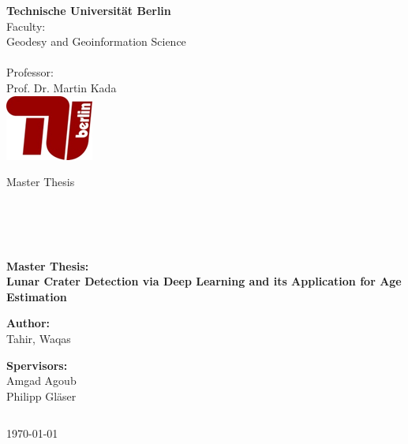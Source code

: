 \documentclass[11pt]{article}
\begin{document}
\begin{titlepage}
	\begin{multicols}{2} 
		\textbf {Technische Universit\"{a}t Berlin}\\
		Faculty:            \\ Geodesy and Geoinformation Science\\  \\
		Professor: \\
		Prof. Dr. Martin Kada\\
		\columnbreak
		\flushright
		\includegraphics{files/TU} 
	\end{multicols}

	\vspace{0.1\textheight}
	
	\begin{center}
		Master Thesis
	\end{center}
	
	\begin{verbatim}
 
 
 
	\end{verbatim}
	\begin{center}
		\textbf{\Large{Master Thesis: \\[1 cm] Lunar Crater Detection via Deep Learning and its Application for Age Estimation}}
	\end{center}
	\vspace{0.25\textheight}
	\begin{center}
		\vspace{0.7cm}
		\textbf{Author:}\\
		Tahir, Waqas \\
	\end{center}
	\begin{center}	
		\textbf{Spervisors:}\\
		Amgad Agoub\\
		Philipp Gläser
	\end{center}
	\begin{verbatim}
	\end{verbatim}
	\begin{center}
		\today
	\end{center}

\end{titlepage}
\end{document}
